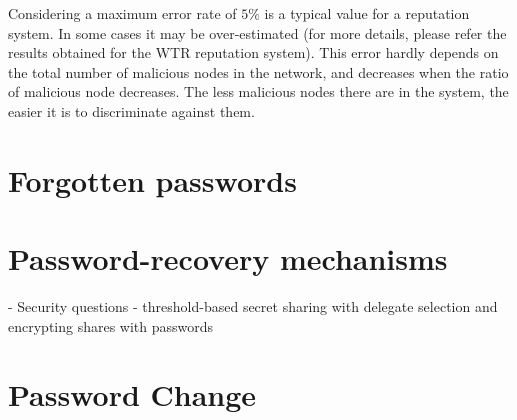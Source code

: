 Considering a maximum error rate of $5\%$ is a typical
value for a reputation system. In some cases it may be
over-estimated (for more details, please refer the results
obtained for the WTR reputation system\cite{wrt_reputation_system}). This
error hardly depends on the total number of malicious
nodes in the network, and decreases when the ratio
of malicious node decreases. The less malicious nodes
there are in the system, the easier it is to discriminate
against them.



\section{Forgotten passwords}

\section{Password-recovery mechanisms}
  - Security questions
  - threshold-based secret sharing with delegate selection and encrypting
  shares with passwords

\section{Password Change}

